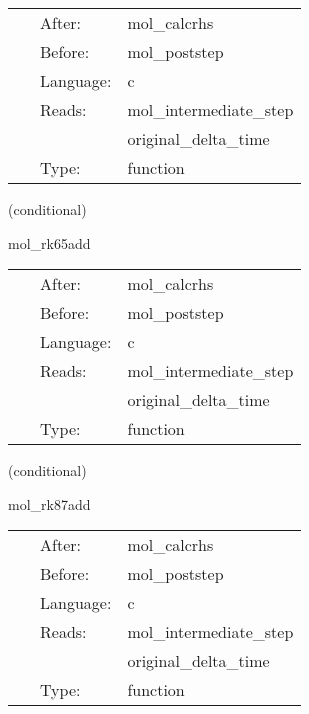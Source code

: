 \hspace{5mm}

 \begin{tabular*}{160mm}{cll} 
~ & After:  & mol\_calcrhs \\ 
~ & Before:  & mol\_poststep \\ 
~ & Language:  & c \\ 
~ & Reads:  & mol\_intermediate\_step \\ 
~& ~ &original\_delta\_time\\ 
~ & Type:  & function \\ 
\end{tabular*} 


\vspace{5mm}

   (conditional) 

\hspace{5mm} mol\_rk65add 

\hspace{5mm}{\it updates calculated with the runge-kutta 65 method } 


\hspace{5mm}

 \begin{tabular*}{160mm}{cll} 
~ & After:  & mol\_calcrhs \\ 
~ & Before:  & mol\_poststep \\ 
~ & Language:  & c \\ 
~ & Reads:  & mol\_intermediate\_step \\ 
~& ~ &original\_delta\_time\\ 
~ & Type:  & function \\ 
\end{tabular*} 


\vspace{5mm}

   (conditional) 

\hspace{5mm} mol\_rk87add 

\hspace{5mm}{\it updates calculated with the runge-kutta 87 method } 


\hspace{5mm}

 \begin{tabular*}{160mm}{cll} 
~ & After:  & mol\_calcrhs \\ 
~ & Before:  & mol\_poststep \\ 
~ & Language:  & c \\ 
~ & Reads:  & mol\_intermediate\_step \\ 
~& ~ &original\_delta\_time\\ 
~ & Type:  & function \\ 
\end{tabular*} 



